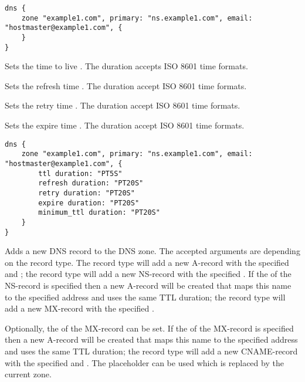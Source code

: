 \begin{lstlisting}[style=Java]
dns {
    zone "example1.com", primary: "ns.example1.com", email: "hostmaster@example1.com", {
    }
}
\end{lstlisting}


Sets the time to live . 
The duration accepts ISO 8601 time formats.


Sets the refresh time .
The duration accept ISO 8601 time formats.


Sets the retry time .
The duration accept ISO 8601 time formats.


Sets the expire time .
The duration accept ISO 8601 time formats.

\begin{lstlisting}[style=Java]
dns {
    zone "example1.com", primary: "ns.example1.com", email: "hostmaster@example1.com", {
        ttl duration: "PT5S"
        refresh duration: "PT20S"
        retry duration: "PT20S"
        expire duration: "PT20S"
        minimum_ttl duration: "PT20S"
    }
}
\end{lstlisting}


Adds a new DNS record to the DNS zone. 
The accepted arguments are depending on
the record type. The  record type will add a new A-record with the 
specified  and ; 
the  record type will add a 
new NS-record with the specified . If 
the  of the NS-record is specified then a new A-record will be 
created that maps this name to the specified address and uses the 
same TTL duration;
the  record type will add a 
new MX-record with the specified . 

Optionally, the 
of the MX-record can be set. If the  of the MX-record is 
specified then a new A-record will be created that maps this name to the 
specified address and uses the same TTL duration;
the  record type will add
a new CNAME-record with the specified  and .
The placeholder \qcode{\%} can be used which is replaced by the current zone.

